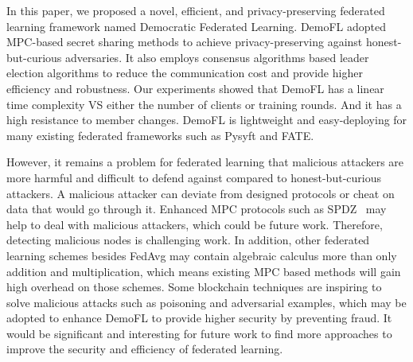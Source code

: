 In this paper, we proposed a novel, efficient, and privacy-preserving federated learning framework named Democratic Federated Learning. DemoFL adopted MPC-based secret sharing methods to achieve privacy-preserving against honest-but-curious adversaries. It also employs consensus algorithms based leader election algorithms to reduce the communication cost and provide higher efficiency and robustness. Our experiments showed that DemoFL has a linear time complexity VS either the number of clients or training rounds. And it has a high resistance to member changes. DemoFL is lightweight and easy-deploying for many existing federated frameworks such as Pysyft and FATE.

However, it remains a problem for federated learning that malicious attackers are more harmful and difficult to defend against compared to honest-but-curious attackers. A malicious attacker can deviate from designed protocols or cheat on data that would go through it. Enhanced MPC protocols such as SPDZ~\cite{SPDZ} may help to deal with malicious attackers, which could be future work. Therefore, detecting malicious nodes is challenging work. In addition, other federated learning schemes besides FedAvg may contain algebraic calculus more than only addition and multiplication, which means existing MPC based methods will gain high overhead on those schemes. Some blockchain techniques are inspiring to solve malicious attacks such as poisoning and adversarial examples, which may be adopted to enhance DemoFL to provide higher security by preventing fraud. It would be significant and interesting for future work to find more approaches to improve the security and efficiency of federated learning.
